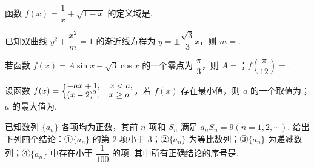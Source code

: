 \documentclass[a4paper,11pt]{report}
\begin{document}
\begin{examquestions}[start=11]
\item 函数 $f(x)=\dfrac1x+\sqrt{1-x}$ 的定义域是\blank.
\item 已知双曲线 $y^2+\dfrac{x^2}{m}=1$ 的渐近线方程为 $y=\pm\dfrac{\sqrt3}{3}x$，则 $m=$\blank.
\item 若函数 $f(x)=A\sin x-\sqrt3\cos x$ 的一个零点为 $\dfrac\pi3$，则 $A=$\blank；$f\left(\dfrac\pi{12}\right)=$\blank.
\item 设函数 $f(x)=\linsys{-ax+1,\quad x<a,\\(x-2)^2,\quad x\geq a}$，若 $f(x)$ 存在最小值，则 $a$ 的一个取值为\blank；$a$ 的最大值为\blank.
\newpage
\item 已知数列 $\{a_n\}$ 各项均为正数，其前 $n$ 项和 $S_n$ 满足 $a_nS_n=9(n=1,2,\cdots)$. 给出下列四个结论：①$\{a_n\}$ 的第 $2$ 项小于 $3$；②$\{a_n\}$ 为等比数列；③$\{a_n\}$ 为递减数列；④$\{a_n\}$ 中存在小于 $\dfrac1{100}$ 的项. 其中所有正确结论的序号是\blank.
\end{examquestions}
\end{document}
